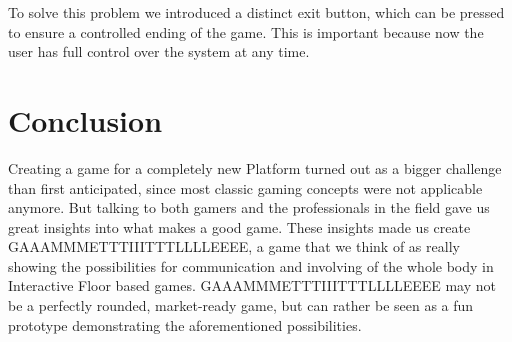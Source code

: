\documentclass{sigchi}
\begin{document}
To solve this problem we introduced a distinct exit button, which can be pressed to ensure a controlled ending of the game. This is important because now the user has full control over the system at any time. 

\section{Conclusion}
\vspace{1mm}
Creating a game for a completely new Platform turned out as a bigger challenge than first anticipated, since most classic gaming concepts were not applicable anymore. But talking to both gamers and the professionals in the field gave us great insights into what makes a good game. These insights made us create GAAAMMMETTTIIITTTLLLLEEEE, a game that we think of as really showing the possibilities for communication and involving of the whole body in Interactive Floor based games. \newline
GAAAMMMETTTIIITTTLLLLEEEE may not be a perfectly rounded, market-ready game, but can rather be seen as a fun prototype demonstrating the aforementioned possibilities.


\balance
\end{document}
